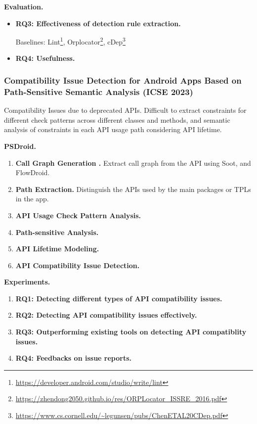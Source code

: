 \textbf{Evaluation.} 

\begin{itemize}
    \item \textbf{RQ3: Effectiveness of detection rule extraction.} 

    Baselines: Lint\footnote{\url{https://developer.android.com/studio/write/lint}}, Orplocator\footnote{\url{https://zhendong2050.github.io/res/ORPLocator_ISSRE_2016.pdf}}, cDep\footnote{\url{https://www.cs.cornell.edu/~legunsen/pubs/ChenETAL20CDep.pdf}}


     
    \item \textbf{RQ4: Usefulness.} 
    
\end{itemize}

\subsubsection{Compatibility Issue Detection for Android Apps Based on Path-Sensitive Semantic Analysis (ICSE 2023)}

Compatibility Issues due to deprecated APIs. Difficult to extract constraints for different check patterns across different classes and methods, and semantic analysis of constraints in each API usage path considering API lifetime.

\textbf{PSDroid.} 

\begin{enumerate}
    \item \textbf{Call Graph Generation .} Extract call graph from the API using Soot, and FlowDroid. 

    \item \textbf{Path Extraction.} Distinguish the APIs used by the main packages or TPLs in the app. 

    \item \textbf{API Usage Check Pattern Analysis.}

    \item \textbf{Path-sensitive Analysis.}

    \item \textbf{API Lifetime Modeling.}

    \item \textbf{API Compatibility Issue Detection.}

\end{enumerate}

\textbf{Experiments.} 

\begin{enumerate}

    \item \textbf{RQ1: Detecting different types of API compatibility issues.}

    \item \textbf{RQ2: Detecting API compatibility issues effectively.}

    \item \textbf{RQ3: Outperforming existing tools on detecting API compatiblity issues.}
    \item \textbf{RQ4: Feedbacks on issue reports.}

\end{enumerate}

